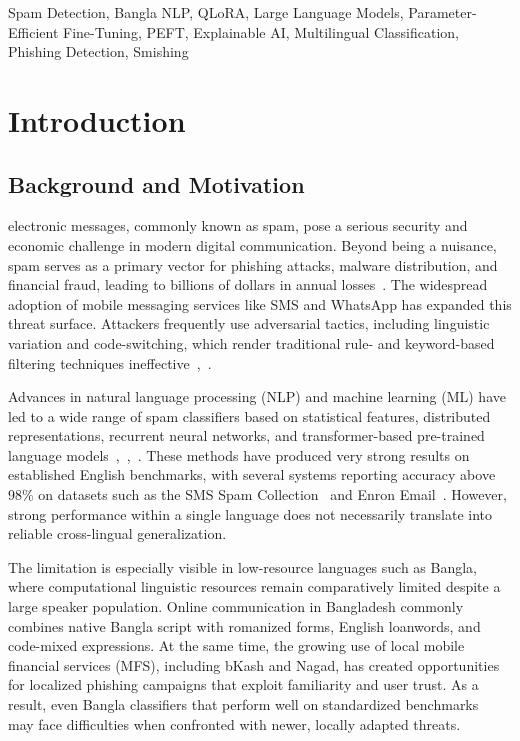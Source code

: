 \documentclass[journal]{IEEEtran}
\begin{document}
\begin{IEEEkeywords}
Spam Detection, Bangla NLP, QLoRA, Large Language Models, Parameter-Efficient Fine-Tuning, PEFT, Explainable AI, Multilingual Classification, Phishing Detection, Smishing
\end{IEEEkeywords}

\section{Introduction}

\subsection{Background and Motivation}

 electronic messages, commonly known as spam, pose a serious security and economic challenge in modern digital communication. Beyond being a nuisance, spam serves as a primary vector for phishing attacks, malware distribution, and financial fraud, leading to billions of dollars in annual losses~\cite{ref1}. The widespread adoption of mobile messaging services like SMS and WhatsApp has expanded this threat surface. Attackers frequently use adversarial tactics, including linguistic variation and code-switching, which render traditional rule- and keyword-based filtering techniques ineffective~\cite{ref5},~\cite{ref6}.

Advances in natural language processing (NLP) and machine learning (ML) have led to a wide range of spam classifiers based on statistical features, distributed representations, recurrent neural networks, and transformer-based pre-trained language models~\cite{ref4},~\cite{ref7},~\cite{ref9}. These methods have produced very strong results on established English benchmarks, with several systems reporting accuracy above 98\% on datasets such as the SMS Spam Collection~\cite{ref1} and Enron Email~\cite{ref9}. However, strong performance within a single language does not necessarily translate into reliable cross-lingual generalization.

The limitation is especially visible in low-resource languages such as Bangla, where computational linguistic resources remain comparatively limited despite a large speaker population. Online communication in Bangladesh commonly combines native Bangla script with romanized forms, English loanwords, and code-mixed expressions. At the same time, the growing use of local mobile financial services (MFS), including bKash and Nagad, has created opportunities for localized phishing campaigns that exploit familiarity and user trust. As a result, even Bangla classifiers that perform well on standardized benchmarks~\cite{ref7} may face difficulties when confronted with newer, locally adapted threats.
\end{document}
